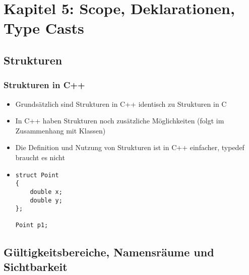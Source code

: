 
\section{Kapitel 5: Scope, Deklarationen, Type Casts\hfill}
\label{sec:Kapitel 5: Scope, Deklarationen, Type Casts}


\subsection{Strukturen\hfill}
\label{sec:Strukturen}

\subsubsection{Strukturen in C++\hfill}
\label{sec:Strukturen in C++}
\begin{itemize}
	\item Grundsätzlich sind Strukturen in C++ identisch zu Strukturen in C
	\item In C++ haben Strukturen noch zusätzliche Möglichkeiten (folgt im Zusammenhang mit Klassen)
	\item Die Definition und Nutzung von Strukturen ist in C++ einfacher, typedef braucht es nicht
	\item[\-] 
	\noindent
\begin{minipage}{\linewidth}
\begin{lstlisting}
struct Point
{
	double x;
	double y;		
};
	
Point p1;
\end{lstlisting}
\end{minipage}
\end{itemize}

\subsection{Gültigkeitsbereiche, Namensräume und Sichtbarkeit\hfill}
\label{sec:Gueltigkeitsbereiche, Namensraeume und Sichtbarkeit}


